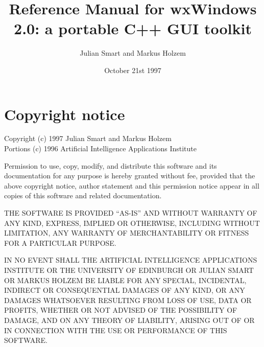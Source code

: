 \addtolength{\textwidth}{1in}
\addtolength{\oddsidemargin}{-0.5in}
\addtolength{\topmargin}{-0.5in}
\addtolength{\textheight}{1in}
\sloppy
\newcommand{\indexit}[1]{#1\index{#1}}
\newcommand{\pipe}[0]{$\|$\ }%



\parskip=10pt
\parindent=0pt
\title{Reference Manual for wxWindows 2.0: a portable C++ GUI toolkit}
\author{Julian Smart and Markus Holzem}
\date{October 21st 1997}

\makeindex

\maketitle

\pagestyle{fancyplain}

\setfooter{\thepage}{}{}{}{}{\thepage}
\tableofcontents


\chapter*{Copyright notice}
%
\setfooter{\thepage}{}{}{}{}{\thepage}

\begin{center}
Copyright (c) 1997 Julian Smart and Markus Holzem\\
Portions (c) 1996 Artificial Intelligence Applications Institute\\
\end{center}

Permission to use, copy, modify, and distribute this software and its
documentation for any purpose is hereby granted without fee, provided that the
above copyright notice, author statement and this permission notice appear in
all copies of this software and related documentation.

THE SOFTWARE IS PROVIDED ``AS-IS'' AND WITHOUT WARRANTY OF ANY KIND, EXPRESS,
IMPLIED OR OTHERWISE, INCLUDING WITHOUT LIMITATION, ANY WARRANTY OF
MERCHANTABILITY OR FITNESS FOR A PARTICULAR PURPOSE.

IN NO EVENT SHALL THE ARTIFICIAL INTELLIGENCE APPLICATIONS INSTITUTE OR THE
UNIVERSITY OF EDINBURGH OR JULIAN SMART OR MARKUS HOLZEM BE LIABLE FOR ANY SPECIAL, INCIDENTAL, INDIRECT OR
CONSEQUENTIAL DAMAGES OF ANY KIND, OR ANY DAMAGES WHATSOEVER RESULTING FROM
LOSS OF USE, DATA OR PROFITS, WHETHER OR NOT ADVISED OF THE POSSIBILITY OF
DAMAGE, AND ON ANY THEORY OF LIABILITY, ARISING OUT OF OR IN CONNECTION WITH
THE USE OR PERFORMANCE OF THIS SOFTWARE.

